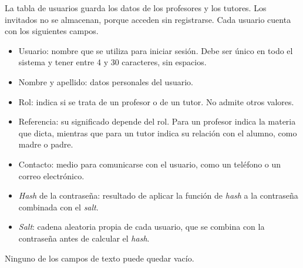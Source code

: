 

La tabla de usuarios guarda los datos de los profesores y los tutores. Los invitados no se almacenan, porque acceden sin registrarse. Cada usuario cuenta con los siguientes campos.


\begin{itemize}

\item Usuario: nombre que se utiliza para iniciar sesión. Debe ser único en todo el sistema y tener entre 4 y 30 caracteres, sin espacios.

\item Nombre y apellido: datos personales del usuario.

\item Rol: indica si se trata de un profesor o de un tutor. No admite otros valores.

\item Referencia: su significado depende del rol. Para un profesor indica la materia que dicta, mientras que para un tutor indica su relación con el alumno, como madre o padre.

\item Contacto: medio para comunicarse con el usuario, como un teléfono o un correo electrónico.

\item \emph{Hash} de la contraseña: resultado de aplicar la función de \emph{hash} a la contraseña combinada con el \emph{salt}.

\item \emph{Salt}: cadena aleatoria propia de cada usuario, que se combina con la contraseña antes de calcular el \emph{hash}.

\end{itemize}

Ninguno de los campos de texto puede quedar vacío.


